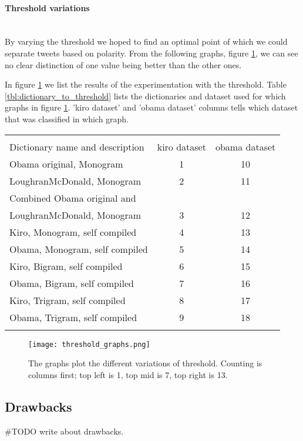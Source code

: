 \paragraph{Threshold variations}
\hspace{0pt}\\
By varying the threshold we hoped to find an optimal point of which we could
separate tweets based on polarity. From the following
graphs, figure \ref{fig:threshold_graphs}, we can see no clear distinction of
one value being better than the other ones.  

In figure \ref{fig:threshold_graphs} we list the results of the experimentation
with the threshold. Table \ref{tbl:dictionary_to_threshold} lists the
dictionaries and dataset used for which graphs in figure \ref{fig:threshold_graphs}.
'kiro dataset' and 'obama dataset' columns tells which dataset that was
classified in which graph.

\begin{tabular}{ l c c }
\hspace{0pt}\\
Dictionary name and description & kiro dataset & obama dataset \\ 
Obama original, Monogram & 1 & 10 \\
LoughranMcDonald, Monogram & 2 & 11 \\
Combined Obama original and \\ LoughranMcDonald, Monogram & 3 & 12 \\
Kiro, Monogram, self compiled & 4 & 13 \\
Obama, Monogram, self compiled & 5 & 14 \\
Kiro, Bigram, self compiled & 6 & 15 \\
Obama, Bigram, self compiled & 7 & 16 \\
Kiro, Trigram, self compiled & 8 & 17 \\
Obama, Trigram, self compiled & 9 & 18 \\

\label{tbl:dictionary_to_threshold}
\end{tabular}

\begin{figure}[htb]
    \centering
    \texttt{[image: threshold\_graphs.png]} 
    \caption{The graphs plot the different variations of threshold. Counting is
columns first; top left is 1, top mid is 7, top right is 13.}
    \label{fig:threshold_graphs}
\end{figure}

\subsection{Drawbacks}
#TODO write about drawbacks.

